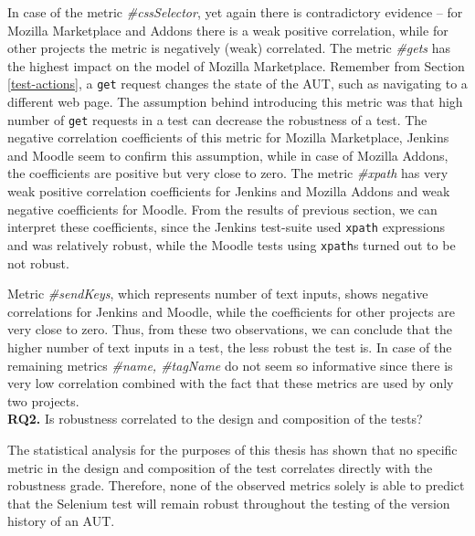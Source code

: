 In case of the metric \textit{\#cssSelector}, yet again there is contradictory evidence -- for Mozilla Marketplace and Addons there is a weak positive correlation, while for other projects the metric is negatively (weak) correlated. The metric \textit{\#gets} has the highest impact on the model of Mozilla Marketplace. Remember from Section \ref{test-actions}, a \texttt{get} request changes the state of the AUT, such as navigating to a different web page. The assumption behind introducing this metric was that high number of \texttt{get} requests in a test can decrease the robustness of a test. The negative correlation coefficients of this metric for Mozilla Marketplace, Jenkins and Moodle seem to confirm this assumption, while in case of Mozilla Addons, the coefficients are positive but very close to zero. The metric \textit{\#xpath} has very weak positive correlation coefficients for Jenkins and Mozilla Addons and weak negative coefficients for Moodle. From the results of previous section, we can interpret these coefficients, since the Jenkins test-suite used \texttt{xpath} expressions and was relatively robust, while the Moodle tests using \texttt{xpath}s turned out to be not robust. 

Metric \textit{\#sendKeys}, which represents number of text inputs, shows negative correlations for Jenkins and Moodle, while the coefficients for other projects are very close to zero. Thus, from these two observations, we can conclude that the higher number of text inputs in a test, the less robust the test is. 
In case of the remaining metrics \textit{\#name, \#tagName} do not seem so informative since there is very low correlation combined with the fact that these metrics are used by only two projects. \\
%  



\noindent\textbf{RQ2.} Is robustness correlated to the design and composition of the tests?

The statistical analysis for the purposes of this thesis has shown that no specific metric in the design and composition of the test correlates directly with the robustness grade. 
Therefore, none of the observed metrics solely is able to predict that the Selenium test will remain robust throughout the testing of the version history of an AUT.

